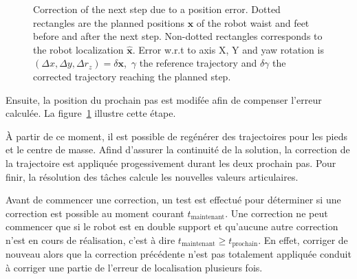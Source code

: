 \begin{figure}[ht!]
\begin{center}
  \end{center}
  \caption{Correction of the next step due to a position error. Dotted
    rectangles are the planned positions $\mathbf{x}$ of the robot
    waist and feet before and after the next step. Non-dotted
    rectangles corresponds to the robot localization
    $\mathbf{\hat{x}}$. Error w.r.t to axis X, Y and yaw rotation is
    \mbox{$(\Delta x, \Delta y, \Delta r_z) = \delta \mathbf{x}$,
      $\gamma$} the reference trajectory and $\delta \gamma$ the
    corrected trajectory reaching the planned
    step. \label{fig:footstepreplan}}
\end{figure}


Ensuite, la position du prochain pas est modifée afin de compenser
l'erreur calculée. La figure~\ref{fig:footstepreplan} illustre cette étape.


À partir de ce moment, il est possible de regénérer des trajectoires
pour les pieds et le centre de masse. Afind d'assurer la continuité de
la solution, la correction de la trajectoire est appliquée
progessivement durant les deux prochain pas. Pour finir, la résolution
des tâches calcule les nouvelles valeurs articulaires.


Avant de commencer une correction, un test est effectué pour
déterminer si une correction est possible au moment courant
$t_{\text{maintenant}}$. Une correction ne peut commencer que si le
robot est en double support et qu'aucune autre correction n'est en
cours de réalisation, c'est à dire \mbox{$t_{\text{maintenant}} \geq
  t_{\text{prochain}}$}. En effet, corriger de nouveau alors que la
correction précédente n'est pas totalement appliquée conduit à
corriger une partie de l'erreur de localisation plusieurs fois.


